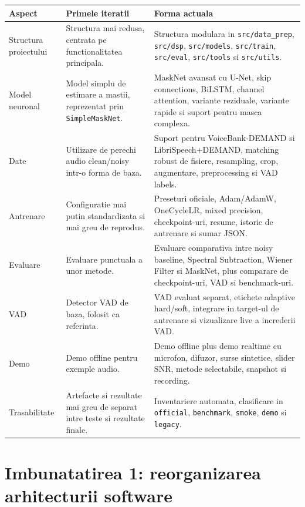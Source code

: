 \documentclass[12pt,a4paper]{article}
\begin{document}
\begin{longtable}{p{}p{}p{}}
\toprule
\textbf{Aspect} & \textbf{Primele iteratii} & \textbf{Forma actuala} \\
\midrule
\endhead
Structura proiectului &
Structura mai redusa, centrata pe functionalitatea principala. &
Structura modulara in \texttt{src/data\_prep}, \texttt{src/dsp},
\texttt{src/models}, \texttt{src/train}, \texttt{src/eval}, \texttt{src/tools}
si \texttt{src/utils}. \\
\addlinespace
Model neuronal &
Model simplu de estimare a mastii, reprezentat prin \texttt{SimpleMaskNet}. &
MaskNet avansat cu U-Net, skip connections, BiLSTM, channel attention, variante
reziduale, variante rapide si suport pentru masca complexa. \\
\addlinespace
Date &
Utilizare de perechi audio clean/noisy intr-o forma de baza. &
Suport pentru VoiceBank-DEMAND si LibriSpeech+DEMAND, matching robust de fisiere,
resampling, crop, augmentare, preprocessing si VAD labels. \\
\addlinespace
Antrenare &
Configuratie mai putin standardizata si mai greu de reprodus. &
Preseturi oficiale, Adam/AdamW, OneCycleLR, mixed precision, checkpoint-uri,
resume, istoric de antrenare si sumar JSON. \\
\addlinespace
Evaluare &
Evaluare punctuala a unor metode. &
Evaluare comparativa intre noisy baseline, Spectral Subtraction, Wiener Filter si
MaskNet, plus comparare de checkpoint-uri, VAD si benchmark-uri. \\
\addlinespace
VAD &
Detector VAD de baza, folosit ca referinta. &
VAD evaluat separat, etichete adaptive hard/soft, integrare in target-ul de
antrenare si vizualizare live a increderii VAD. \\
\addlinespace
Demo &
Demo offline pentru exemple audio. &
Demo offline plus demo realtime cu microfon, difuzor, surse sintetice, slider SNR,
metode selectabile, snapshot si recording. \\
\addlinespace
Trasabilitate &
Artefacte si rezultate mai greu de separat intre teste si rezultate finale. &
Inventariere automata, clasificare in \texttt{official}, \texttt{benchmark},
\texttt{smoke}, \texttt{demo} si \texttt{legacy}. \\
\bottomrule
\end{longtable}

\section{Imbunatatirea 1: reorganizarea arhitecturii software}
\end{document}
